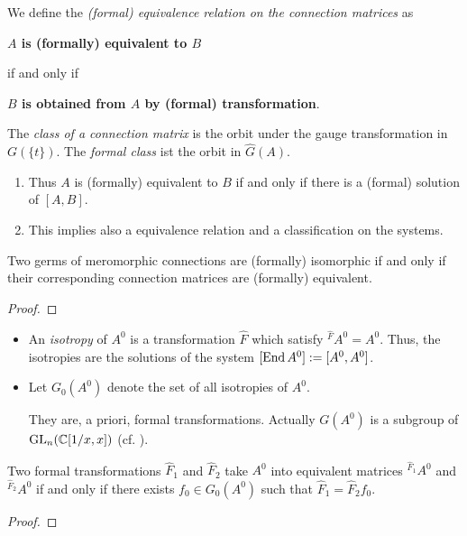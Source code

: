 \begin{defn}
  We define the \emph{(formal) equivalence relation on the connection matrices}
  as
  \begin{einr}
    \textbf{\boldmath$A$ is (formally) equivalent to $B$}
  \end{einr}
  if and only if
  \begin{einr}
    \textbf{\boldmath$B$ is obtained from $A$ by (formal) transformation}.
  \end{einr}
  The \emph{class of a connection matrix} is the orbit under the gauge
  transformation in $G(\!\{t\}\!)$. The \emph{formal class} ist the orbit in
  $\hat G(A)$.
  \begin{s-rem}
    \begin{enumerate}
      \item Thus $A$ is (formally) equivalent to $B$ if and only if there is a
        (formal) solution of $[A,B]$.
      \item This implies also a equivalence relation and a classification on
        the systems.
    \end{enumerate}
  \end{s-rem}
\end{defn}

\begin{prop}
  Two germs of meromorphic connections are (formally) isomorphic if and only if
  their corresponding connection matrices are (formally) equivalent.
\end{prop}
\begin{proof}
  \TODO{}
\end{proof}

\begin{defn}
  \begin{itemize}
    \item An \emph{isotropy} of $A^0$ is a transformation $\hat F$ which
      satisfy ${}^{\hat F}\!A^0=A^0$.
      Thus, the isotropies are the solutions of the system
      $[\operatorname{End} A^0]:=[A^0,A^0]$.
    \item Let $G_0(A^0)$ denote the set of all isotropies of $A^0$.
      \begin{s-rem}
        They are, a priori, formal transformations. Actually $G(A^0)$ is a
        subgroup of $\operatorname{GL}_n(\mathbb{C}[1/x,x])$ (cf. \TODO{}).
      \end{s-rem}
      \begin{comment}
        In the nice case this is only $T$?
      \end{comment}
  \end{itemize}
\end{defn}
\begin{lem}
  Two formal transformations $\hat F_1$ and $\hat F_2$ take $A^0$ into
  equivalent matrices ${}^{\hat F_1}\!A^0$ and  ${}^{\hat F_2}\!A^0$ if and
  only if there exists $f_0\in G_0(A^0)$ such that $\hat F_1=\hat F_2f_0$.
\end{lem}
\begin{proof}
  \TODO{}
\end{proof}

